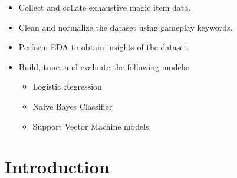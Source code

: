 \documentclass[12pt]{diazessay}
\begin{document}
\begin{itemize}
	
	\item Collect and collate exhaustive magic item data.
	\item Clean and normalize the dataset using gameplay keywords.
	\item Perform EDA to obtain insights of the dataset.
	\item Build, tune, and evaluate the following models:
	\begin{itemize}
		\item Logistic Regression
		\item Naive Bayes Classifier
		\item Support Vector Machine models.
	\end{itemize}

\end{itemize}

\clearpage

\section*{Introduction}

\clearpage



\end{document}
